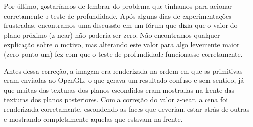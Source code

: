 \documentclass[a4paper,10pt]{article}
\begin{document}
Por último, gostaríamos de lembrar do problema que tínhamos para acionar corretamente o teste de profundidade. Após alguns dias de experimentações frustradas, encontramos uma discussão em um fórum que dizia que o valor do plano próximo (z-near) não poderia ser zero. Não encontramos qualquer explicação sobre o motivo, mas alterando este valor para algo levemente maior (zero-ponto-um) fez com que o teste de profundidade funcionasse corretamente.

Antes dessa correção, a imagem era renderizada na ordem em que as primitivas eram enviadas ao OpenGL, o que gerava um resultado confuso e sem sentido, já que muitas das texturas dos planos escondidos eram mostradas na frente das texturas dos planos posteriores. Com a correção do valor z-near, a cena foi renderizada corretamente, escondendo as faces que deveriam estar atrás de outras e mostrando completamente aquelas que estavam na frente.
\end{document}
